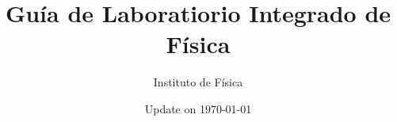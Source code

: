 
% 




\title{\bf \huge Gu\'ia de Laboratiorio Integrado de F\'isica}
\author{Instituto de F\'isica}
\date{Update on \today}
\maketitle
\setcounter{tocdepth}{2}
\setcounter{minitocdepth}{1} 

\begin{multicols}{2}
    \dominitoc%
    \adjustmtc[3]%
    \tableofcontents
    \label{toc-contents}
\end{multicols}



%


%

% 
%
% 

%
% 

%

\backmatter


\printbibliography[heading=bibintoc]
\printindex



